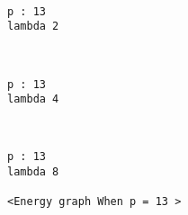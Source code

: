\documentclass[11pt]{article}
\begin{document}
    \begin{center}
    \end{center}
    { \hspace*{\fill} \\}
    
    \begin{Verbatim}[commandchars=\\\{\}]
p : 13
lambda 2

    \end{Verbatim}

    \begin{center}
    \end{center}
    { \hspace*{\fill} \\}
    
    \begin{Verbatim}[commandchars=\\\{\}]
p : 13
lambda 4

    \end{Verbatim}

    \begin{center}
    \end{center}
    { \hspace*{\fill} \\}
    
    \begin{Verbatim}[commandchars=\\\{\}]
p : 13
lambda 8

<Energy graph When p = 13 >

    \end{Verbatim}

    \begin{center}
    \end{center}
    { \hspace*{\fill} \\}
    
    \begin{center}
    \end{center}
    { \hspace*{\fill} \\}
    
\end{document}
